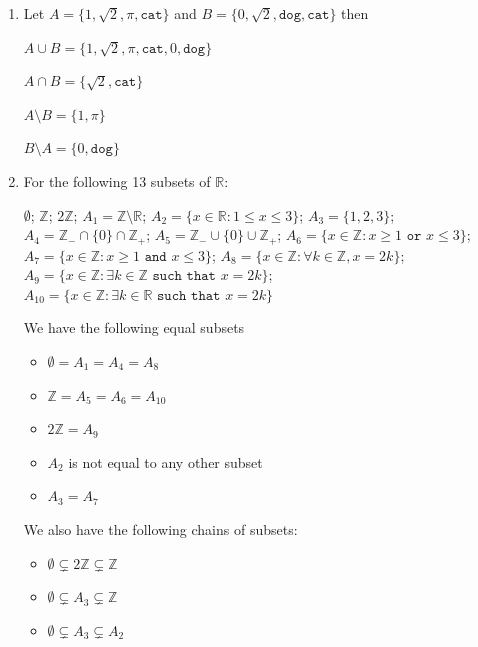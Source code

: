 \documentclass[11pt,a4paper]{article}
\newcommand{\Z}{\mathbb{Z}}
\newcommand{\R}{\mathbb{R}}
\begin{document}
\begin{enumerate}
\begin{enumerate}
            \item $\{\texttt{cat}\} \notin A$ is true. 
            \item $\{1, \texttt{cat}\} \subseteq A$ is false. 
            \item $\{\texttt{cat}, \alpha\} \subseteq A$ is true. 
            \item $\emptyset \subsetneq A$ is true.
            \item $A = \{\alpha, \texttt{cat}, \{1, \texttt{cat}\}, \{\alpha\}\}$ is true.
                \item $A = \{1, \{1, \texttt{cat},\}, \alpha\}$ is false.
    \end{enumerate}
    \item Let $A = \{1, \sqrt{2}, \pi, \texttt{cat}\}$ and $B = \{0, \sqrt{2}, \texttt{dog}, \texttt{cat}\}$ then 
    
        $A \cup B = \{1, \sqrt{2}, \pi, \texttt{cat}, 0, \texttt{dog}\}$

        $A \cap B = \{\sqrt{2}, \texttt{cat}\}$

        $A \setminus B = \{1,  \pi\}$ 

        $B \setminus A = \{0, \texttt{dog}\}$ 
    \item For the following 13 subsets of $\R$:

        $\emptyset$;    $\Z$;      $2\Z$; $A_1 = \Z \setminus \R$;   $A_2 = \{x \in \R : 1 \leq x \leq 3\}$;  
        $A_3 = \{1,2,3\}$;   $A_4 = \Z_{-} \cap \{0\} \cap \Z_{+}$; $A_5 = \Z_{-} \cup \{0\} \cup \Z_{+}$;
        $A_6 = \{x \in \Z : x \geq 1 \texttt{ or } x \leq 3\}$;   $A_7 = \{ x \in \Z : x \geq 1 \texttt{ and } x \leq 3 \}$; $A_8 = \{ x \in \Z: \forall k \in \Z , x = 2k\}$;  $A_9 = \{x \in \Z: \exists k \in \Z \texttt{ such that } x = 2k\}$; $A_{10} = \{x \in \Z: \exists k \in \R \texttt{ such that } x = 2k\}$
        
        We have the following equal subsets
        \begin{itemize}
            \item $\emptyset = A_1 = A_4 = A_8$
            \item $\Z = A_5 = A_6 = A_{10}$
            \item $2\Z = A_9$
            \item $A_2$ is not equal to any other subset
            \item $A_3 = A_7$
        \end{itemize}
        We also have the following chains of subsets:
        \begin{itemize}
            \item $\emptyset \subsetneq 2\Z \subsetneq \Z$
            \item $\emptyset \subsetneq A_3 \subsetneq \Z$
            \item $\emptyset \subsetneq A_3 \subsetneq A_2$
        \end{itemize}


\end{enumerate}
\end{document}
